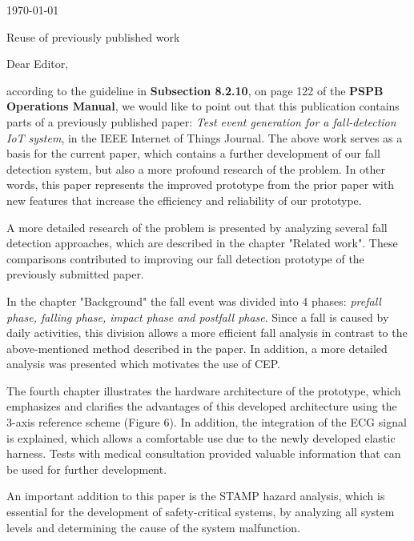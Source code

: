 \documentclass[parskip]{scrartcl}
\begin{document}
 
\pagestyle{empty}

\begin{flushright}
    \Large
    \today
\end{flushright}

\begin{center}
    \huge
    Reuse of previously published work \\
    \vspace{0.4cm}

\end{center}
 
    \vspace{0.8cm}

    \normalsize

Dear Editor,

according to the guideline in \textbf{Subsection 8.2.10}, on page 122 of the \textbf{PSPB Operations Manual}, we would like to point out that this publication contains parts of a previously published paper: \textit{Test event generation for a fall-detection IoT system}, in the IEEE Internet of Things Journal. The above work serves as a basis for the current paper, which contains a further development of our fall detection system, but also a more profound research of the problem. In other words, this paper represents the improved prototype from the prior paper with new features that increase the efficiency and reliability of our prototype.

A more detailed research of the problem is presented by analyzing several fall detection approaches, which are described in the chapter "Related work". These comparisons contributed to improving our fall detection prototype of the previously submitted paper. 

In the chapter "Background" the fall event was divided into 4 phases: \textit{prefall phase, falling phase, impact phase and postfall phase}. Since a fall is caused by daily activities, this division allows a more efficient fall analysis in contrast to the above-mentioned method described in the paper.
In addition, a more detailed analysis was presented which motivates the use of CEP. 

The fourth chapter illustrates the hardware architecture of the prototype, which emphasizes and clarifies the advantages of this developed architecture using the 3-axis reference scheme (Figure 6). In addition, the integration of the ECG signal is explained, which allows a comfortable use due to the newly developed elastic harness. Tests with medical consultation provided valuable information that can be used for further development. 

An important addition to this paper is the STAMP hazard analysis, which is essential for the development of safety-critical systems, by analyzing all system levels and determining the cause of the system malfunction.
\end{document}
